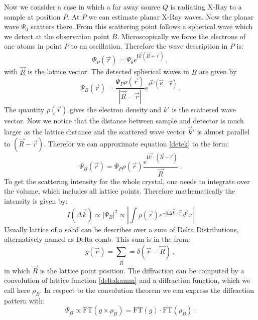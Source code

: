 	Now we consider a case in which a far away source $Q$ is radiating X-Ray to a sample at position $P$. At $P$ we can estimate planar X-Ray waves. Now the planar wave $\Psi_0$ scatters there. From this scattering point follows a spherical wave which we detect at the observation point $B$. Microscopically we force the electrons of one atoms in point $P$ to an oscillation. Therefore the wave description in $P$ is:
	\begin{equation}
		\Psi_P(\vec r)= \Psi_0 e^{\boldsymbol{i}\vec k (\vec R+\vec r)}~\mathrm{,}
	\end{equation}
	with $\vec R$ is the lattice vector. The detected spherical waves in $B$ are given by
	\begin{equation}
		\Psi_B(\vec r)= \frac{\Psi_P \rho(\vec r)}{|\vec R- \vec r|}e^{\boldsymbol{i}\vec k' (\vec R - \vec r)}~\mathrm{.}
		\label{detek}
	\end{equation}
	The quantity $\rho(\vec r)$ gives the electron density and $k'$ is the scattered wave vector. Now we notice that the distance between sample and detector is much larger as the lattice distance and the scattered wave vector $\vec k'$ is almost parallel to $(\vec R-\vec r)$. Therefor we can approximate equation \ref{detek} to the form:
	\begin{equation}
		\Psi_B(\vec{r})=\Psi_P \rho(\vec r) \frac{e^{\boldsymbol{i}\vec {k'} \cdot (\vec R-\vec r)}}{\vec R}~\mathrm{.}
	\end{equation}
	To get the scattering intensity for the whole crystal, one needs to integrate over the volume, which includes all lattice points. Therefore mathematically the intensity is given by:
	\begin{equation}
		I(\Delta \vec k)\propto |\Psi_B|^2\propto \left| \int \rho(\vec r) e^{-\boldsymbol{i}\Delta \vec k \cdot \vec r}d^3r \right|
	\end{equation}
	Usually lattice of a solid can be describes over a sum of Delta Distributions, alternatively named as Delta comb. This sum is in the from:
	\begin{equation}
		g(\vec r)=\sum_{\vec R}=\delta(\vec r -\vec R)~\mathrm{,}
		\label{deltakamm}
	\end{equation}
	in which $\vec R$ is the lattice point position. The diffraction can be computed by a convolution of lattice function \ref{deltakamm} and a diffraction function, which we call here $\rho_B$. In respect to the convolution theorem we can express the diffraction pattern with:
	\begin{equation}
		\Psi_B \propto \mathrm{FT}(g \times \rho_B)=\mathrm{FT}(g) \cdot \mathrm{FT}(\rho_B)~\mathrm{.}
	\end{equation}
